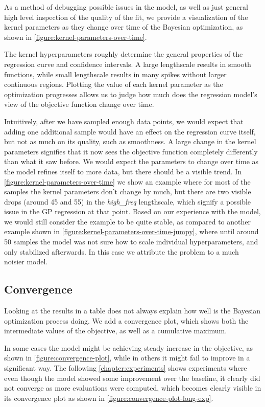 As a method of debugging possible issues in the model, as well as just general high level inspection of the quality of the fit, we provide a visualization of the kernel parameters as they change over time of the Bayesian optimization, as shown in \autoref{figure:kernel-parameters-over-time}.

The kernel hyperparameters roughly determine the general properties of the regression curve and confidence intervals. A large lengthscale results in smooth functions, while small lengthscale results in many spikes without larger continuous regions. Plotting the value of each kernel parameter as the optimization progresses allows us to judge how much does the regression model's view of the objective function change over time.

Intuitively, after we have sampled enough data points, we would expect that adding one additional sample would have an effect on the regression curve itself, but not as much on its quality, such as smoothness. A large change in the kernel parameters signifies that it now sees the objective function completely differently than what it saw before. We would expect the parameters to change over time as the model refines itself to more data, but there should be a visible trend. In \autoref{figure:kernel-parameters-over-time} we show an example where for most of the samples the kernel parameters don't change by much, but there are two visible drops (around 45 and 55) in the \emph{high\_freq} lengthscale, which signify a possible issue in the GP regression at that point. Based on our experience with the model, we would still consider the example to be quite stable, as compared to another example shown in \autoref{figure:kernel-parameters-over-time-jumpy}, where until around 50 samples the model was not sure how to scale individual hyperparameters, and only stabilized afterwards. In this case we attribute the problem to a much noisier model.

\subsection{Convergence}
\label{section:convergence}

Looking at the results in a table does not always explain how well is the Bayesian optimization process doing. We add a convergence plot, which shows both the intermediate values of the objective, as well as a cumulative maximum. 

In some cases the model might be achieving steady increase in the objective, as shown in \autoref{figure:convergence-plot}, while in others it might fail to improve in a significant way. The following \autoref{chapter:experiments} shows experiments where even though the model showed some improvement over the baseline, it clearly did not converge as more evaluations were computed, which becomes clearly visible in its convergence plot as shown in \autoref{figure:convergence-plot-long-exp}.

